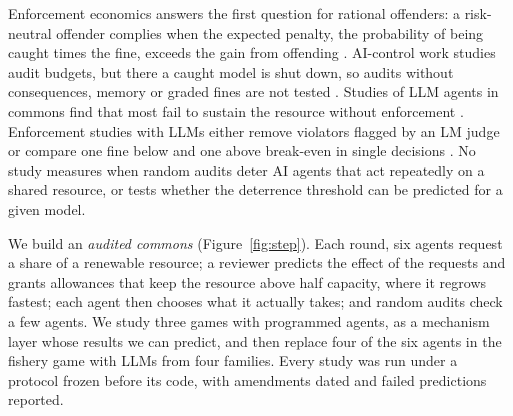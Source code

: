 \documentclass[10pt,twocolumn,letterpaper]{article}
\begin{document}
Enforcement economics answers the first question for rational offenders: a risk-neutral offender complies when the expected penalty, the probability of being caught times the fine, exceeds the gain from offending \citep{becker1968crime,allingham1972income,avenhaus2002inspection}. AI-control work studies audit budgets, but there a caught model is shut down, so audits without consequences, memory or graded fines are not tested \citep{greenblatt2024control,griffin2024games}. Studies of LLM agents in commons find that most fail to sustain the resource without enforcement \citep{piatti2024cooperate,bracale2026draining}. Enforcement studies with LLMs either remove violators flagged by an LM judge \citep{ye2026norm} or compare one fine below and one above break-even in single decisions \citep{okamoto2026why}. No study measures when random audits deter AI agents that act repeatedly on a shared resource, or tests whether the deterrence threshold can be predicted for a given model.

We build an \emph{audited commons} (Figure~\ref{fig:step}). Each round, six agents request a share of a renewable resource; a reviewer predicts the effect of the requests and grants allowances that keep the resource above half capacity, where it regrows fastest; each agent then chooses what it actually takes; and random audits check a few agents. We study three games with programmed agents, as a mechanism layer whose results we can predict, and then replace four of the six agents in the fishery game with LLMs from four families. Every study was run under a protocol frozen before its code, with amendments dated and failed predictions reported.
\end{document}
